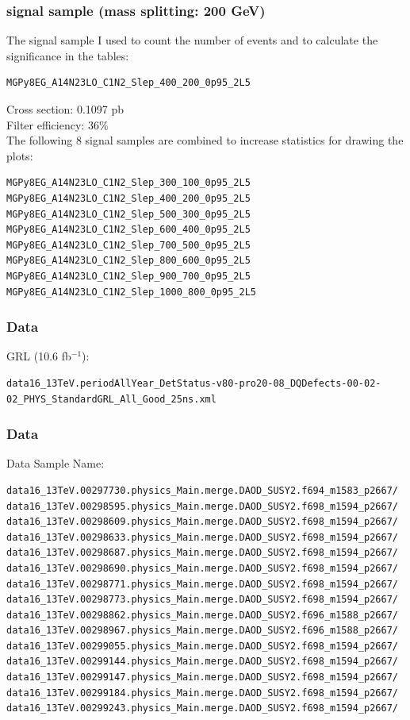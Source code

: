 \documentclass[mathserif,serif]{beamer}
\begin{document}
\begin{frame}[fragile]
\frametitle{signal sample (mass splitting: 200 GeV)}
\small
The signal sample I used to count the number of events and to calculate the significance in the tables:
\tiny
\begin{verbatim}
MGPy8EG_A14N23LO_C1N2_Slep_400_200_0p95_2L5
\end{verbatim}
\small
Cross section: 0.1097 pb \\
Filter efficiency: 36\% \\
\vspace{5mm}
The following 8 signal samples are combined to increase statistics for drawing the plots:
\tiny
\begin{verbatim}
MGPy8EG_A14N23LO_C1N2_Slep_300_100_0p95_2L5
MGPy8EG_A14N23LO_C1N2_Slep_400_200_0p95_2L5
MGPy8EG_A14N23LO_C1N2_Slep_500_300_0p95_2L5
MGPy8EG_A14N23LO_C1N2_Slep_600_400_0p95_2L5
MGPy8EG_A14N23LO_C1N2_Slep_700_500_0p95_2L5
MGPy8EG_A14N23LO_C1N2_Slep_800_600_0p95_2L5
MGPy8EG_A14N23LO_C1N2_Slep_900_700_0p95_2L5
MGPy8EG_A14N23LO_C1N2_Slep_1000_800_0p95_2L5
\end{verbatim}
\end{frame}

\begin{frame}[fragile]
\frametitle{Data}
\small
GRL (10.6 fb$^{-1}$):\\
\tiny
\begin{verbatim}
data16_13TeV.periodAllYear_DetStatus-v80-pro20-08_DQDefects-00-02-02_PHYS_StandardGRL_All_Good_25ns.xml
\end{verbatim}
\end{frame}

\begin{frame}[fragile]
\frametitle{Data}
\small
Data Sample Name:
\tiny
\begin{verbatim}
data16_13TeV.00297730.physics_Main.merge.DAOD_SUSY2.f694_m1583_p2667/
data16_13TeV.00298595.physics_Main.merge.DAOD_SUSY2.f698_m1594_p2667/
data16_13TeV.00298609.physics_Main.merge.DAOD_SUSY2.f698_m1594_p2667/
data16_13TeV.00298633.physics_Main.merge.DAOD_SUSY2.f698_m1594_p2667/
data16_13TeV.00298687.physics_Main.merge.DAOD_SUSY2.f698_m1594_p2667/
data16_13TeV.00298690.physics_Main.merge.DAOD_SUSY2.f698_m1594_p2667/
data16_13TeV.00298771.physics_Main.merge.DAOD_SUSY2.f698_m1594_p2667/
data16_13TeV.00298773.physics_Main.merge.DAOD_SUSY2.f698_m1594_p2667/
data16_13TeV.00298862.physics_Main.merge.DAOD_SUSY2.f696_m1588_p2667/
data16_13TeV.00298967.physics_Main.merge.DAOD_SUSY2.f696_m1588_p2667/
data16_13TeV.00299055.physics_Main.merge.DAOD_SUSY2.f698_m1594_p2667/
data16_13TeV.00299144.physics_Main.merge.DAOD_SUSY2.f698_m1594_p2667/
data16_13TeV.00299147.physics_Main.merge.DAOD_SUSY2.f698_m1594_p2667/
data16_13TeV.00299184.physics_Main.merge.DAOD_SUSY2.f698_m1594_p2667/
data16_13TeV.00299243.physics_Main.merge.DAOD_SUSY2.f698_m1594_p2667/
\end{verbatim}
\end{frame}
\end{document}
